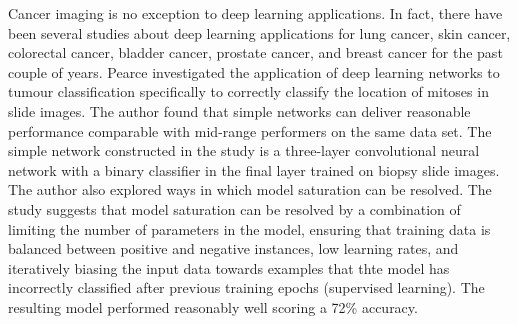 	Cancer imaging is no exception to deep learning applications. In fact, there have been several studies about deep learning applications for lung cancer, skin cancer, colorectal cancer, bladder cancer, prostate cancer, and breast cancer for the past couple of years. Pearce \cite{pearce} investigated the application of deep learning networks to tumour classification specifically to correctly classify the location of mitoses in slide images. The author found that simple networks can deliver reasonable performance comparable with mid-range performers on the same data set. The simple network constructed in the study is a three-layer convolutional neural network with a binary classifier in the final layer trained on biopsy slide images. The author also explored ways in which model saturation can be resolved. The study suggests that model saturation can be resolved by a combination of limiting the number of parameters in the model, ensuring that training data is balanced between positive and negative instances, low learning rates, and iteratively biasing the input data towards examples that thte model has incorrectly classified after previous training epochs (supervised learning). The resulting model performed reasonably well scoring a 72\% accuracy. \\

